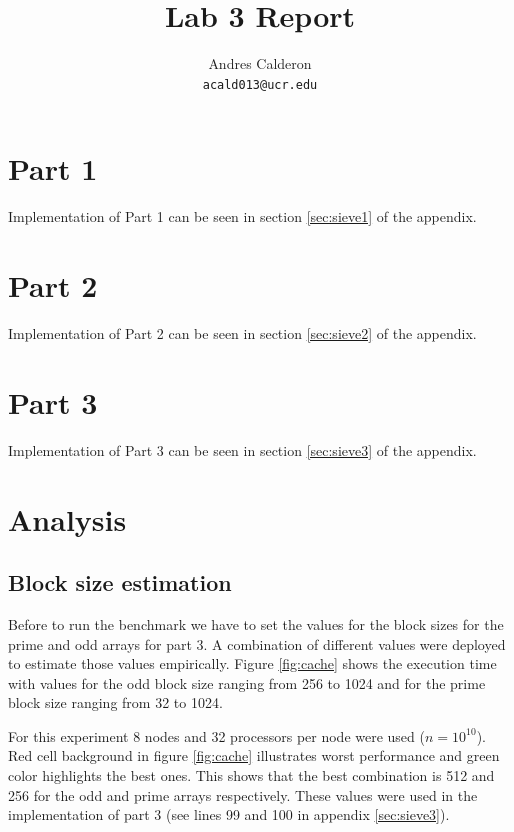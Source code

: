 \documentclass[10pt]{scrartcl}
\title{Lab 3 Report}
\author{
   Andres Calderon\\
  \small \texttt{acald013@ucr.edu}
}
\begin{document}
\maketitle

\section{Part 1}
Implementation of Part 1 can be seen in section \ref{sec:sieve1} of the appendix.

\section{Part 2}
Implementation of Part 2 can be seen in section \ref{sec:sieve2} of the appendix.

\section{Part 3}
Implementation of Part 3 can be seen in section \ref{sec:sieve3} of the appendix.

\section{Analysis}
\subsection{Block size estimation}
Before to run the benchmark we have to set the values for the block sizes for the prime and odd arrays for part 3.  A combination of different values were deployed to estimate those values empirically.  Figure \ref{fig:cache} shows the execution time with values for the odd block size ranging from 256 to 1024 and for the prime block size ranging from 32 to 1024.  

For this experiment 8 nodes and 32 processors per node were used ($n=10^{10}$). Red cell background in figure \ref{fig:cache} illustrates worst performance and green color highlights the best ones.  This shows that the best combination is 512 and 256 for the odd and prime arrays respectively.  These values were used in the implementation of part 3 (see lines 99 and 100 in appendix \ref{sec:sieve3}).
\end{document}
